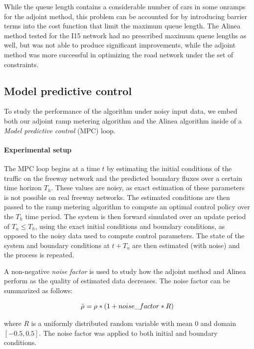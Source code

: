 While the queue length contains a considerable number of cars in some
onramps for the adjoint method, this problem can be accounted for
by introducing barrier terms into the cost function that limit the
maximum queue length. The Alinea method tested for the I15 network
had no prescribed maximum queue lengths as well, but was not able
to produce significant improvements, while the adjoint method was
more successful in optimizing the road network under the set of constraints.


\subsection{Model predictive control\label{sub:Model-predictive-control}}

To study the performance of the algorithm under noisy input data,
we embed both our adjoint ramp metering algorithm and the Alinea algorithm
inside of a \emph{Model predictive control }(MPC) loop.


\paragraph{Experimental setup}

The MPC loop begins at a time $t$ by estimating the initial conditions
of the traffic on the freeway network and the predicted boundary fluxes
over a certain time horizon $T_{h}$. These values are noisy, as exact
estimation of these parameters is not possible on real freeway networks.
The estimated conditions are then passed to the ramp metering algorithm
to compute an optimal control policy over the $T_{h}$ time period.
The system is then forward simulated over an update period of $T_{u}\le T_{h}$,
using the exact initial conditions and boundary conditions, as opposed
to the noisy data used to compute control parameters. The state of
the system and boundary conditions at $t+T_{u}$ are then estimated
(with noise) and the process is repeated.

A non-negative\emph{ noise factor} is used to study how the adjoint
method and Alinea perform as the quality of estimated data decreases.
The noise factor can be summarized as follows:

\[
\bar{\rho_{}^{}}=\rho_{}^{}*(1+noise\_factor*R)
\]


where $R$ is a uniformly distributed random variable with mean $0$
and domain $\left[-0.5,0.5\right]$. The noise factor was applied
to both initial and boundary conditions.

